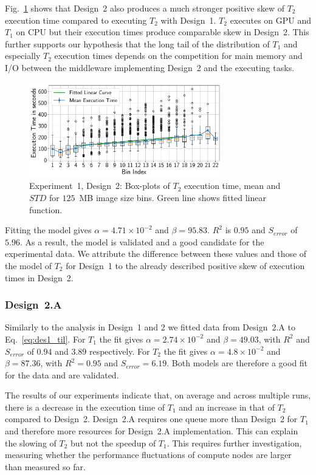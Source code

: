 Fig.~\ref{fig:stage_2_execution_des2} shows that Design~2 also produces a much stronger positive skew of $T_{2}$ execution time compared to executing $T_{2}$ with Design~1.
$T_{2}$ executes on GPU and $T_{1}$ on CPU but their execution times produce comparable skew in Design~2.
This further supports our hypothesis that the long tail of the distribution of $T_{1}$ and especially $T_{2}$ execution times depends on the competition for main memory and I/O between the middleware implementing Design~2 and the executing tasks.


\begin{figure}[t]
    \centering
    \includegraphics[width=0.75\textwidth]{figures/designs/stage_1_tx_box_des2.pdf}
    \caption{Experiment~1, Design~2: Box-plots of $T_{2}$ execution time, mean and $STD$ for $125$~MB image size bins.
        Green line shows fitted linear function.}\label{fig:stage_2_execution_des2}
\end{figure}

Fitting the model gives $\alpha = 4.71 \times 10^{-2}$ and $\beta = 95.83$.
$R^{2}$ is $0.95$ and $S_{error}$ of $5.96$.
As a result, the model is validated and a good candidate for the experimental data.
We attribute the difference between these values and those of the model of $T_{2}$ for Design~1 to the already described positive skew of execution times in Design~2.

\subsubsection{Design~2.A} Similarly to the analysis in Design~1 and 2 we fitted data from Design~2.A to Eq.~\ref{eq:des1_til}.
For $T_{1}$ the fit gives $\alpha=2.74\times10^{-2}$ and $\beta=49.03$, with $R^{2}$ and $S_{error}$ of $0.94$ and $3.89$ respectively.
For $T_{2}$ the fit gives $\alpha=4.8\times10^{-2}$ and $\beta=87.36$, with $R^{2}=0.95$ and $S_{error}=6.19$.
Both models are therefore a good fit for the data and are validated.

The results of our experiments indicate that, on average and across multiple runs, there is a decrease in the execution time of $T_{1}$ and an increase in that of $T_{2}$ compared to Design~2.
Design~2.A requires one queue more than Design~2 for $T_{1}$ and therefore more resources for Design~2.A implementation.
This can explain the slowing of $T_{2}$ but not the speedup of $T_{1}$.
This requires further investigation, measuring whether the performance fluctuations of compute nodes are larger than measured so far.


